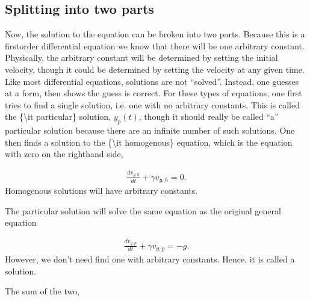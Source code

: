 \documentclass[letterpaper,10pt,english]{sphinxmanual}
\begin{document}
\subsection{Splitting into two parts}
\label{\detokenize{chapter3:splitting-into-two-parts}}
Now, the solution to the equation can be broken into two
parts. Because this is a first\sphinxhyphen{}order differential equation we know
that there will be one arbitrary constant. Physically, the arbitrary
constant will be determined by setting the initial velocity, though it
could be determined by setting the velocity at any given time. Like
most differential equations, solutions are not “solved”. Instead,
one guesses at a form, then shows the guess is correct. For these
types of equations, one first tries to find a single solution,
i.e. one with no arbitrary constants. This is called the \{\textbackslash{}it
particular\} solution, \(y_p(t)\), though it should really be called
“a” particular solution because there are an infinite number of such
solutions. One then finds a solution to the \{\textbackslash{}it homogenous\} equation,
which is the equation with zero on the right\sphinxhyphen{}hand side,




\begin{equation*}
\begin{split}
\begin{equation}
\frac{dv_{y,h}}{dt}+\gamma v_{y,h}=0.
\label{_auto7} \tag{7}
\end{equation}
\end{split}
\end{equation*}
Homogenous solutions will have arbitrary constants.

The particular solution will solve the same equation as the original
general equation




\begin{equation*}
\begin{split}
\begin{equation}
\frac{dv_{y,p}}{dt}+\gamma v_{y,p}=-g.
\label{_auto8} \tag{8}
\end{equation}
\end{split}
\end{equation*}
However, we don’t need find one with arbitrary constants. Hence, it is
called a  solution.

The sum of the two,
\end{document}
